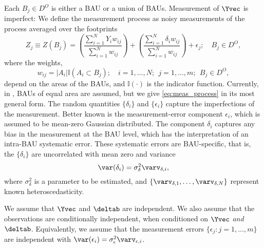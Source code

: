 Each $B_j \in D^O$ is either a BAU or a union of BAUs. Measurement of $\Yvec$ is imperfect: We define the measurement process as noisy measurements of the process averaged over the footprints
\begin{equation}\label{eq:meas_process}
Z_j \equiv Z(B_j) = \left(\frac{\sum_{i =1}^N Y_i w_{ij}}{\sum_{i=1}^N w_{ij}}\right) + \left(\frac{\sum_{i =1}^N \delta_i w_{ij}}{\sum_{i=1}^N w_{ij}}\right) + \epsilon_j; \quad B_j \in D^O,
\end{equation}
where the weights,
$$ w_{ij} = |A_i|\mathbb{I}(A_i \subset B_j); \quad i = 1,\dots,N;~~j = 1,\dots, m; ~~B_j \in D^O,$$
depend on the areas of the BAUs, and $\mathbb{I}(\cdot)$ is the indicator function. Currently, in , BAUs of equal area are assumed, but we give \eqref{eq:meas_process} in its most general form.   The random quantities $\{\delta_i\}$ and $\{\epsilon_i\}$ capture the imperfections of the measurement. Better known is the measurement-error component $\epsilon_i$, which is assumed to be mean-zero Gaussian distributed. The component $\delta_i$ captures any bias in the measurement at the BAU level, which has the interpretation of an intra-BAU systematic error. These systematic errors are BAU-specific, that is, the $\{\delta_i\}$ are uncorrelated with mean zero and variance
\begin{equation*}
\var(\delta_i) = \sigma^2_\delta \varv_{\delta,i},
\end{equation*}
where $\sigma^2_\delta$ is a parameter to be estimated, and $\{\varv_{\delta,1},\dots,\varv_{\delta,N}\}$  represent known heteroscedasticity.

We assume that $\Yvec$ and $\deltab$ are independent. We also assume that the observations are conditionally independent, when conditioned on $\Yvec$ \emph{and} $\deltab$. Equivalently, we assume that the measurement errors $\{\epsilon_j: j = 1,\dots,m\}$ are independent with $\var(\epsilon_i) = \sigma^2_\epsilon\varv_{\epsilon,i}$.

